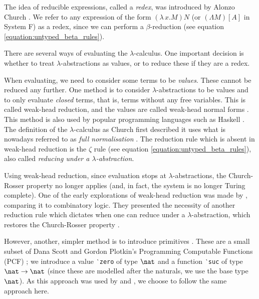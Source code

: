 The idea of reducible expressions, called a \textit{redex}, was introduced by Alonzo Church
\cite[p.~56]{pierce_types_2002}. We refer to any expression of the form $(\lambda \, x. M) N$ (or
$(\Lambda M) [A]$ in System F) as a redex, since we can perform a $\beta$-reduction (see equation
\ref{equation:untyped_beta_rules}).

There are several ways of evaluating the $\lambda$-calculus. One important decision is whether to
treat $\lambda$-abstractions as values, or to reduce these if they are a redex.

When evaluating, we need to consider some terms to be \textit{values}. These cannot be reduced any
further. One method is to consider $\lambda$-abstractions to be values and to only evaluate
\textit{closed} terms, that is, terms without any free variables. This is called weak-head
reduction, and the values are called weak-head normal forms \citep{wadler_programming_2022}. This
method is also used by popular programming languages such as Haskell \citep{hutchison_sharing_2005}.
The definition of the $\lambda$-calculus as Church first described it uses what is nowadays referred
to as \textit{full normalisation} \citep{wadler_programming_2022}. The reduction rule which is
absent in weak-head reduction is the $\zeta$ rule (see equation \ref{equation:untyped_beta_rules}),
also called \textit{reducing under a $\lambda$-abstraction}.

Using weak-head reduction, since evaluation stops at $\lambda$-abstractions, the Church-Rosser
property no longer applies (and, in fact, the system is no longer Turing complete). One of the early
explorations of weak-head reduction was made by \citet{cagman_combinatory_1998}, comparing it to
combinatory logic. They presented the necessity of another reduction rule which dictates when one
can reduce under a $\lambda$-abstraction, which restores the Church-Rosser property
\citep{hutchison_sharing_2005}.

However, another, simpler method is to introduce primitives \citep{wadler_programming_2022}. These
are a small subset of Dana Scott and Gordon Plotkin's Programming Computable Functions (PCF)
\citep{plotkin_lcf_1977}; we introduce a value \texttt{‵zero} of type $\nat$ and a function
\texttt{‵suc} of type $\nat \to \nat$ (since these are modelled after the naturals, we use the base
type $\nat$). As this approach was used by \citet{chargueraud_locally_2012} and
\citet{wadler_programming_2022}, we choose to follow the same approach here.
